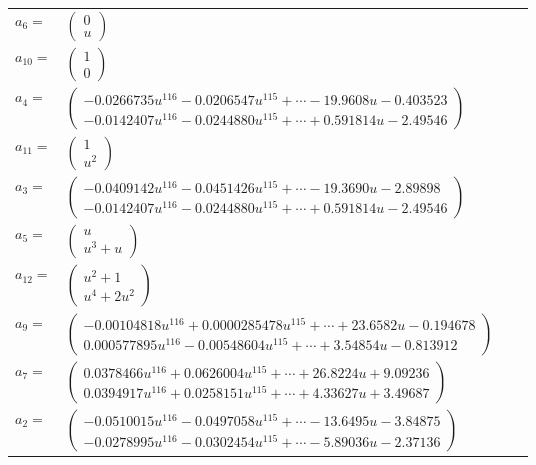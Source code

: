 \documentclass[1p]{elsarticle_modified}
\theoremstyle{definition}
\begin{document}
\begin{tabular}{m{7pt} m{180pt} m{7pt} m{180pt} }
\flushright $a_{6}=$&$\begin{pmatrix}0\\u\end{pmatrix}$ \\
\flushright $a_{10}=$&$\begin{pmatrix}1\\0\end{pmatrix}$ \\
\flushright $a_{4}=$&$\begin{pmatrix}-0.0266735 u^{116}-0.0206547 u^{115}+\cdots-19.9608 u-0.403523\\-0.0142407 u^{116}-0.0244880 u^{115}+\cdots+0.591814 u-2.49546\end{pmatrix}$ \\
\flushright $a_{11}=$&$\begin{pmatrix}1\\u^2\end{pmatrix}$ \\
\flushright $a_{3}=$&$\begin{pmatrix}-0.0409142 u^{116}-0.0451426 u^{115}+\cdots-19.3690 u-2.89898\\-0.0142407 u^{116}-0.0244880 u^{115}+\cdots+0.591814 u-2.49546\end{pmatrix}$ \\
\flushright $a_{5}=$&$\begin{pmatrix}u\\u^3+u\end{pmatrix}$ \\
\flushright $a_{12}=$&$\begin{pmatrix}u^2+1\\u^4+2 u^2\end{pmatrix}$ \\
\flushright $a_{9}=$&$\begin{pmatrix}-0.00104818 u^{116}+0.0000285478 u^{115}+\cdots+23.6582 u-0.194678\\0.000577895 u^{116}-0.00548604 u^{115}+\cdots+3.54854 u-0.813912\end{pmatrix}$ \\
\flushright $a_{7}=$&$\begin{pmatrix}0.0378466 u^{116}+0.0626004 u^{115}+\cdots+26.8224 u+9.09236\\0.0394917 u^{116}+0.0258151 u^{115}+\cdots+4.33627 u+3.49687\end{pmatrix}$ \\
\flushright $a_{2}=$&$\begin{pmatrix}-0.0510015 u^{116}-0.0497058 u^{115}+\cdots-13.6495 u-3.84875\\-0.0278995 u^{116}-0.0302454 u^{115}+\cdots-5.89036 u-2.37136\end{pmatrix}$ \\

\end{tabular}
\end{document}
